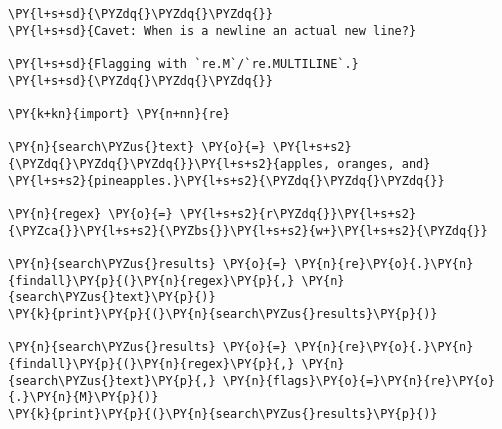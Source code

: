

\section*{}

\begin{Verbatim}[commandchars=\\\{\}]
\PY{l+s+sd}{\PYZdq{}\PYZdq{}\PYZdq{}}
\PY{l+s+sd}{Cavet: When is a newline an actual new line?}

\PY{l+s+sd}{Flagging with `re.M`/`re.MULTILINE`.}
\PY{l+s+sd}{\PYZdq{}\PYZdq{}\PYZdq{}}

\PY{k+kn}{import} \PY{n+nn}{re}

\PY{n}{search\PYZus{}text} \PY{o}{=} \PY{l+s+s2}{\PYZdq{}\PYZdq{}\PYZdq{}}\PY{l+s+s2}{apples, oranges, and}
\PY{l+s+s2}{pineapples.}\PY{l+s+s2}{\PYZdq{}\PYZdq{}\PYZdq{}}

\PY{n}{regex} \PY{o}{=} \PY{l+s+s2}{r\PYZdq{}}\PY{l+s+s2}{\PYZca{}}\PY{l+s+s2}{\PYZbs{}}\PY{l+s+s2}{w+}\PY{l+s+s2}{\PYZdq{}}

\PY{n}{search\PYZus{}results} \PY{o}{=} \PY{n}{re}\PY{o}{.}\PY{n}{findall}\PY{p}{(}\PY{n}{regex}\PY{p}{,} \PY{n}{search\PYZus{}text}\PY{p}{)}
\PY{k}{print}\PY{p}{(}\PY{n}{search\PYZus{}results}\PY{p}{)}

\PY{n}{search\PYZus{}results} \PY{o}{=} \PY{n}{re}\PY{o}{.}\PY{n}{findall}\PY{p}{(}\PY{n}{regex}\PY{p}{,} \PY{n}{search\PYZus{}text}\PY{p}{,} \PY{n}{flags}\PY{o}{=}\PY{n}{re}\PY{o}{.}\PY{n}{M}\PY{p}{)}
\PY{k}{print}\PY{p}{(}\PY{n}{search\PYZus{}results}\PY{p}{)}
\end{Verbatim}
